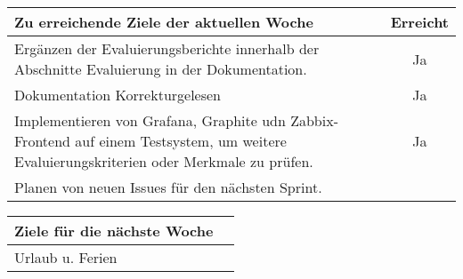 \begin{tabularx}{\textwidth}{Xc}
    \arrayrulecolor{OliveGreen}
    \toprule
    {\bfseries Zu erreichende Ziele der aktuellen Woche} & {\bfseries Erreicht} \\
    \midrule[2pt]
    Ergänzen der Evaluierungsberichte innerhalb der Abschnitte Evaluierung in
    der Dokumentation. &Ja              \\
    \rowcolor{OliveGreen!15}
    Dokumentation Korrekturgelesen                         &Ja               \\
    \rowcolor{White}
    Implementieren von Grafana, Graphite udn Zabbix\hyp{}Frontend auf einem
    Testsystem, um weitere Evaluierungskriterien oder Merkmale zu prüfen. &Ja  \\
    \rowcolor{OliveGreen!15}
    Planen von neuen Issues für den nächsten Sprint.
    \bottomrule[2pt]
\end{tabularx}
%
\vspace{1cm}
%
\begin{tabularx}{\textwidth}{Xc}
    \arrayrulecolor{OliveGreen}
    \toprule
    {\bfseries Ziele für die nächste Woche}        &                         \\
    \midrule[2pt]
    Urlaub u. Ferien                 &                         \\
\end{tabularx}
